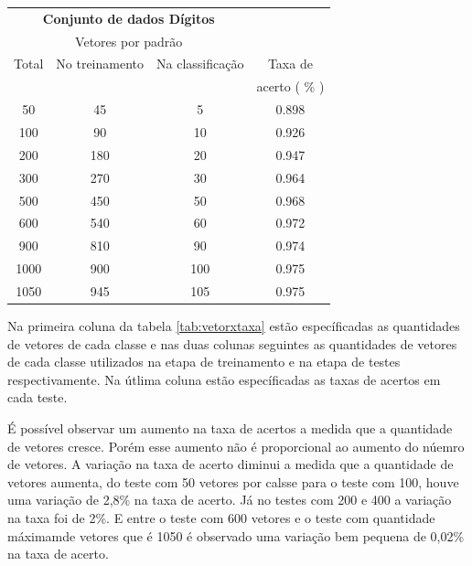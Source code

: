 \begin{center}
	 \begin{tabular}{|c|c|c|c|}
    \cline{1-3}
    \multicolumn{3}{|c|}{\textbf{Conjunto de dados Dígitos}}                     \\ \cline{1-3}
    \multicolumn{3}{|c|}{Vetores por padrão}                    \\ \hline
    Total                     & No treinamento & Na classificação & Taxa de \\ ~                         & ~              & ~                & acerto ( \% ) \\ \hline

    	   50   & 	45		   &		5	& 	0.898\\ \hline
   	  100   & 	90		   &	       10	&	0.926\\ \hline
	  200   &      180   		   &	       20	&	0.947\\ \hline
    	  300 	&      270		   &	       30	&	0.964\\ \hline
    	  500 	&      450  		   & 	       50	&	0.968\\ \hline
    	  600 	&      540		   &	       60	&	0.972\\ \hline
    	  900 	&      810		   &	       90	&	0.974\\ \hline
    	 1000 	&      900		   &	      100	&	0.975\\ \hline
    	 1050 	&      945		   &	      105	&	0.975\\ \hline
	\end{tabular}
	\label{tab:vetorxtaxa}
\end{center}

Na primeira coluna da tabela \ref{tab:vetorxtaxa} estão específicadas as quantidades de vetores de cada classe e nas duas colunas seguintes as quantidades de vetores de cada classe utilizados na etapa de treinamento e na etapa de testes respectivamente. Na útlima coluna estão específicadas as taxas de acertos em cada teste. 

É possível observar um aumento na taxa de acertos a medida que a quantidade de vetores cresce. Porém esse aumento não é proporcional ao aumento do núemro de vetores. A variação na taxa de acerto diminui a medida que a quantidade de vetores aumenta, do teste com 50 vetores por calsse para o teste com 100, houve uma variação de 2,8\% na taxa de acerto. Já no testes com 200 e 400 a variação na taxa foi de 2\%. E entre o teste com 600 vetores e o teste com quantidade máximamde vetores que é 1050 é observado uma variação bem pequena de 0,02\% na taxa de acerto.

